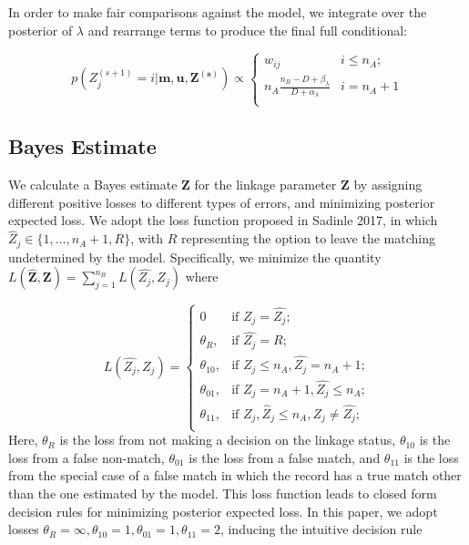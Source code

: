 \documentclass[12pt,letterpaper]{article}
\newcommand{\1}[1]{\mathbb{I}\!\left[#1\right]} %
\begin{document}
In order to make fair comparisons against the \citep{sadinle_bayesian_2017} model, we
integrate over the posterior of \(\lambda\) and rearrange terms to
produce the final full conditional:

\[p\left(Z_j^{(s+1)}  = i| \mathbf{m}, \mathbf{u}, \mathbf{Z^{(s)}}\right) \propto
\begin{cases} 
	w_{ij}  & i \leq n_A; \\
	n_A \frac{n_B - D + \beta_{\lambda}}{D + \alpha_{\lambda}} & i  = n_A + 1 \\
\end{cases}\]

\hypertarget{bayes-estimate}{%
	\subsection{Bayes Estimate}
	\label{bayes-estimate}}

We calculate a Bayes estimate \(\hat{\mathbf{Z}}\) for the linkage
parameter \(\mathbf{Z}\) by assigning different positive losses to
different types of errors, and minimizing posterior expected loss. We
adopt the loss function proposed in Sadinle 2017, in which
\(\hat{Z}_j \in \{1, \ldots, n_A + 1, R\}\), with \(R\) representing the
option to leave the matching undetermined by the model. Specifically, we
minimize the quantity
\(L(\hat{\mathbf{Z}}, \mathbf{Z}) = \sum_{j=1}^{n_B} L(\hat{Z_j}, Z_j)\)
where

\[L(\hat{Z_j}, Z_j)=\begin{cases} 
	0  & \text{if } Z_j = \hat{Z_j}; \\
	\theta_R,  & \text{if } \hat{Z_j} = R; \\
	\theta_{10},  & \text{if } Z_j \leq n_A,\hat{Z_j} = n_A + 1 ; \\
	\theta_{01},  & \text{if } Z_j = n_A + 1,\hat{Z_j} \leq n_A ; \\
	\theta_{11},  & \text{if } Z_j, \hat{Z}_j \leq n_A, Z_j \neq \hat{Z_j} ; \\
\end{cases}\] Here, \(\theta_R\) is the loss from not making a decision
on the linkage status, \(\theta_{10}\) is the loss from a false
non-match, \(\theta_{01}\) is the loss from a false match, and
\(\theta_{11}\) is the loss from the special case of a false match in
which the record has a true match other than the one estimated by the
model. This loss function leads to closed form decision rules for
minimizing posterior expected loss. In this paper, we adopt losses
\(\theta_R = \infty, \theta_{10} = 1, \theta_{01} = 1, \theta_{11} = 2\),
inducing the intuitive decision rule
\end{document}
